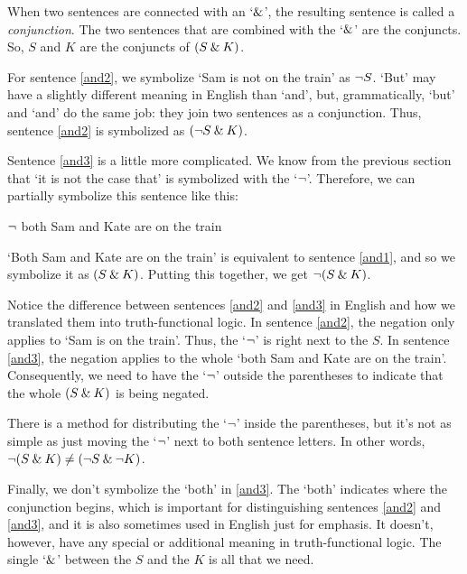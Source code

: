 When two sentences are connected with an `$\mathbin{\&}$', the resulting sentence is called a \textit{conjunction}. The two sentences that are combined with the `$\mathbin{\&}$' are the {conjuncts}. So, $S$ and $K$ are the conjuncts of $(S \mathbin{\&} K)$.

For sentence \ref{and2}, we symbolize `Sam is not on the train' as ${\neg} S$. `But' may have a slightly different meaning in English than `and', but, grammatically, `but' and `and' do the same job: they join two sentences as a conjunction. Thus, sentence \ref{and2} is symbolized as $({\neg} S \mathbin{\&} K)$.

Sentence \ref{and3} is a little more complicated. We know from the previous section that `it is not the case that' is symbolized with the `${\neg}$'. Therefore, we can partially symbolize this sentence like this:
	\begin{earg}
		\item[] ${\neg}$ both Sam and Kate are on the train
	\end{earg}
`Both Sam and Kate are on the train' is equivalent to sentence \ref{and1}, and so we symbolize it as $(S \mathbin{\&} K)$. Putting this together, we get ${\neg}(S \mathbin{\&} K)$. 

Notice the difference between sentences \ref{and2} and \ref{and3} in English and how we translated them into truth-functional logic. In sentence \ref{and2}, the negation only applies to `Sam is on the train'. Thus, the `${\neg}$' is right next to the $S$. In sentence \ref{and3}, the negation applies to the whole `both Sam and Kate are on the train'. Consequently, we need to have the `${\neg}$' outside the parentheses to indicate that the whole $(S \mathbin{\&} K)$ is being negated.

\begin{notebox}
There is a method for distributing the `${\neg}$' inside the parentheses, but it's not as simple as just moving the `${\neg}$' next to both sentence letters. In other words,  ${\neg}(S \mathbin{\&} K) \neq ({\neg} S \mathbin{\&} {\neg} K)$.  
\end{notebox}

Finally, we don't symbolize the `both' in \ref{and3}. The `both' indicates where the conjunction begins, which is important for distinguishing sentences \ref{and2} and \ref{and3}, and it is also sometimes used in English just for emphasis. It doesn't, however, have any special or additional meaning in truth-functional logic. The single `$\mathbin{\&}$' between the $S$ and the $K$ is all that we need.


